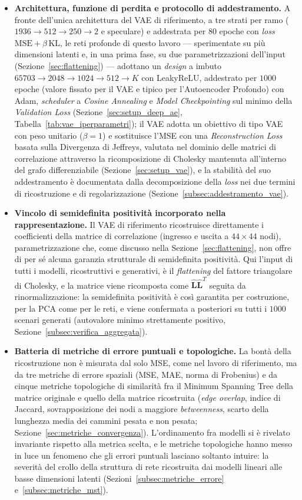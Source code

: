 \begin{itemize}
    \item \textbf{Architettura, funzione di perdita e protocollo di addestramento.} A fronte dell'unica architettura del VAE di riferimento, a tre strati per ramo ($1936 \to 512 \to 250 \to 2$ e speculare) e addestrata per $80$ epoche con \emph{loss} $\mathrm{MSE} + \beta\,\mathrm{KL}$, le reti profonde di questo lavoro --- sperimentate su più dimensioni latenti e, in una prima fase, su due parametrizzazioni dell'input (Sezione~\ref{sec:flattening}) --- adottano un \emph{design} a imbuto $65703 \to 2048 \to 1024 \to 512 \to K$ con LeakyReLU, addestrato per $1000$ epoche (valore fissato per il VAE e tipico per l'Autoencoder Profondo) con Adam, \emph{scheduler} a \emph{Cosine Annealing} e \emph{Model Checkpointing} sul minimo della \emph{Validation Loss} (Sezione~\ref{sec:setup_deep_ae}, Tabella~\ref{tab:vae_iperparametri}); il VAE adotta un obiettivo di tipo VAE con peso unitario ($\beta = 1$) e sostituisce l'MSE con una \emph{Reconstruction Loss} basata sulla Divergenza di Jeffreys, valutata nel dominio delle matrici di correlazione attraverso la ricomposizione di Cholesky mantenuta all'interno del grafo differenziabile (Sezione~\ref{sec:setup_vae}), e la stabilità del suo addestramento è documentata dalla decomposizione della \emph{loss} nei due termini di ricostruzione e di regolarizzazione (Sezione~\ref{subsec:addestramento_vae}).
    \item \textbf{Vincolo di semidefinita positività incorporato nella rappresentazione.} Il VAE di riferimento ricostruisce direttamente i coefficienti della matrice di correlazione (ingresso e uscita a $44 \times 44$ nodi), parametrizzazione che, come discusso nella Sezione~\ref{sec:flattening}, non offre di per sé alcuna garanzia strutturale di semidefinita positività. Qui l'input di tutti i modelli, ricostruttivi e generativi, è il \emph{flattening} del fattore triangolare di Cholesky, e la matrice viene ricomposta come $\hat{\mathbf{L}}\hat{\mathbf{L}}^T$ seguita da rinormalizzazione: la semidefinita positività è così garantita per costruzione, per la PCA come per le reti, e viene confermata a posteriori su tutti i $1000$ scenari generati (autovalore minimo strettamente positivo, Sezione~\ref{subsec:verifica_aggregata}).
    \item \textbf{Batteria di metriche di errore puntuali e topologiche.} La bontà della ricostruzione non è misurata dal solo MSE, come nel lavoro di riferimento, ma da tre metriche di errore spaziali (MSE, MAE, norma di Frobenius) e da cinque metriche topologiche di similarità fra il Minimum Spanning Tree della matrice originale e quello della matrice ricostruita (\emph{edge overlap}, indice di Jaccard, sovrapposizione dei nodi a maggiore \emph{betweenness}, scarto della lunghezza media dei cammini pesata e non pesata; Sezione~\ref{sec:metriche_convergenza}). L'ordinamento fra modelli si è rivelato invariante rispetto alla metrica scelta, e le metriche topologiche hanno messo in luce un fenomeno che gli errori puntuali lasciano soltanto intuire: la severità del crollo della struttura di rete ricostruita dai modelli lineari alle basse dimensioni latenti (Sezioni~\ref{subsec:metriche_errore} e~\ref{subsec:metriche_mst}).

\end{itemize}
